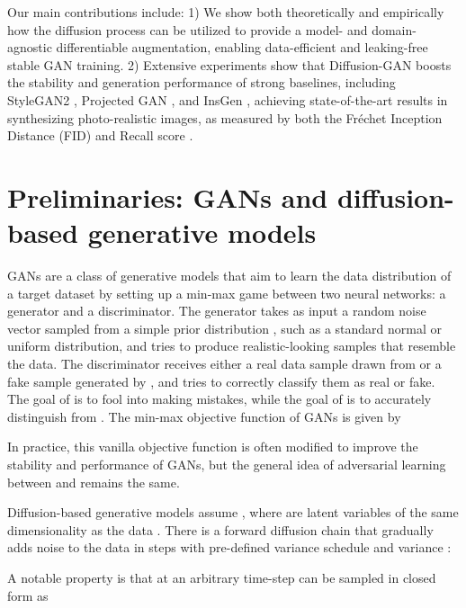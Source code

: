 \documentclass{article} \usepackage{iclr2023_conference,times}
\theoremstyle{plain}
\theoremstyle{definition}
\theoremstyle{remark}
\begin{document}
Our main contributions include: 1) We show both theoretically and empirically how the diffusion process can be utilized to provide a model- and domain-agnostic differentiable augmentation, enabling data-efficient and leaking-free stable GAN training. 
2) 
Extensive experiments show
that Diffusion-GAN 
boosts the stability and generation performance of  strong baselines, 
including StyleGAN2 \citep{karras2020analyzing},  Projected GAN \citep{sauer2021projected}, and InsGen \citep{yang2021data},  achieving state-of-the-art results in synthesizing 
photo-realistic images, as measured by both the Fr\'echet Inception Distance (FID) \citep{heusel2017gans} and Recall score \citep{kynkaanniemi2019improved}.  






\section{Preliminaries: GANs and diffusion-based generative models}
GANs \citep{goodfellow2014generative} are a class of generative models that aim to learn the data distribution  of a target dataset 
by setting up a min-max game between two neural networks: a generator and a discriminator. The generator  takes as input a random noise vector  sampled from a simple prior distribution , such as a standard normal or uniform distribution, and tries to produce realistic-looking samples  that resemble the data. The discriminator  receives either a real data sample  drawn from  or a fake sample  generated by , and tries to correctly classify them as real or fake. The goal of  is to fool  into making mistakes, while the goal of  is to accurately distinguish  from . The min-max objective function of GANs is given by

In practice, this vanilla objective function is often modified to improve the stability and performance of GANs\citep{goodfellow2014generative,Miyato2018SpectralNF,fedus2018many}, but the general idea of adversarial learning between  and  remains the same.



Diffusion-based generative models \citep{ddpm,SohlDickstein2015DeepUL,scorematching} 
assume
, where  are latent variables of the same dimensionality as the data . There is a forward diffusion chain that gradually adds noise to the data  in  steps with pre-defined variance schedule  and variance :

A notable property 
is that  at an
arbitrary time-step  can be sampled in closed form as 
\end{document}
